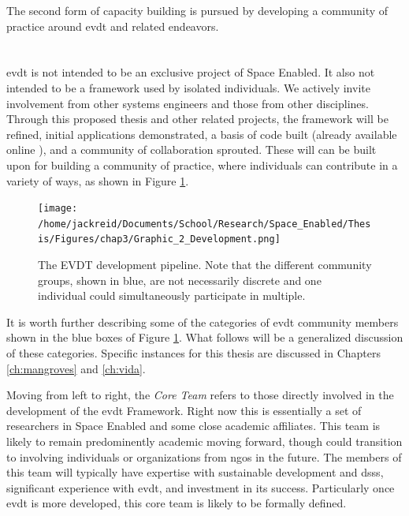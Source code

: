 The second form of capacity building is pursued by developing a community of practice around \ac{evdt} and related endeavors.

\section{} \label{sec:intended}

\ac{evdt} is not intended to be an exclusive project of Space Enabled. It also not intended to be a framework used by isolated individuals. We actively invite involvement from other systems engineers and those from other disciplines. Through this proposed thesis and other related projects, the framework will be refined, initial applications demonstrated, a basis of code built (already available online \cite{bluerasterBlueRasterVida2021,reidEVDTRepository2020,reidMITVidaRepository2021}), and a community of collaboration sprouted. These will can be built upon for building a community of practice, where individuals can contribute in a variety of ways, as shown in Figure \ref{fig:development}.

\begin{figure}[h]
	\centering
	\texttt{[image: /home/jackreid/Documents/School/Research/Space\_Enabled/Thesis/Figures/chap3/Graphic\_2\_Development.png]}
	\caption[The EVDT development pipeline] {The EVDT development pipeline. Note that the different community groups, shown in blue, are not necessarily discrete and one individual could simultaneously participate in multiple.}
	\label{fig:development}
\end{figure}

It is worth further describing some of the categories of \ac{evdt} community members shown in the blue boxes of Figure \ref{fig:development}. What follows will be a generalized discussion of these categories. Specific instances for this thesis are discussed in Chapters \ref{ch:mangroves} and \ref{ch:vida}.

Moving from left to right, the \textit{Core Team} refers to those directly involved in the development of the \ac{evdt} Framework. Right now this is essentially a set of researchers in Space Enabled and some close academic affiliates. This team is likely to remain predominently academic moving forward, though could transition to involving individuals or organizations from \acp{ngo} in the future. The members of this team will typically have expertise with sustainable development and \acp{dss}, significant experience with \ac{evdt}, and investment in its success. Particularly once \ac{evdt} is more developed, this core team is likely to be formally defined.

